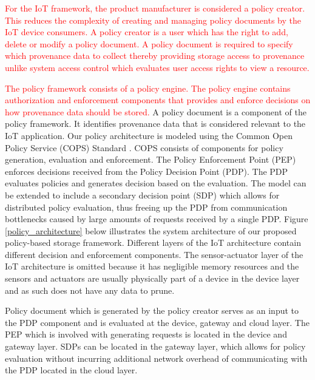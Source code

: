 \textcolor{red}{ For the IoT framework, the product manufacturer is considered a policy creator. This reduces the complexity of creating and managing policy documents by the IoT device consumers. A policy creator is a user which has the right to add, delete or modify a policy document. A policy document is required to specify which provenance data to collect thereby providing storage access to provenance unlike system access control which evaluates user access rights to view a resource. }





\par 

\textcolor{red}{The policy framework consists of a policy engine. The policy engine contains authorization and enforcement components that provides and enforce decisions on how provenance data should be stored. }A policy document is a component of the policy framework. It identifies provenance data that is considered relevant to the IoT application. Our policy architecture is modeled using the Common Open Policy Service (COPS) Standard \cite{rfc2748}. COPS consists of components for policy generation, evaluation and enforcement. The Policy Enforcement Point (PEP) enforces decisions received from the Policy Decision Point (PDP). The PDP evaluates policies and generates decision based on the evaluation. The model can be extended to include a secondary decision point (SDP) which allows for distributed policy evaluation, thus freeing up the PDP from communication bottlenecks caused by large amounts of requests received by a single PDP. Figure \ref{policy_architecture} below illustrates the system architecture of our proposed policy-based storage framework. Different layers of the IoT architecture contain different decision and enforcement components. The sensor-actuator layer of the IoT architecture is omitted because it has negligible memory resources and the  sensors and actuators are usually physically part of a device in the device layer and as such does not have any data to prune. 


Policy document which is generated by the policy creator serves as an input to the PDP component and is evaluated at the device, gateway and cloud layer. The PEP which is involved with generating requests is located in the device and gateway layer. SDPs can be located in the gateway layer, which allows for policy evaluation without incurring additional network overhead of communicating with the PDP located in the cloud layer. 




